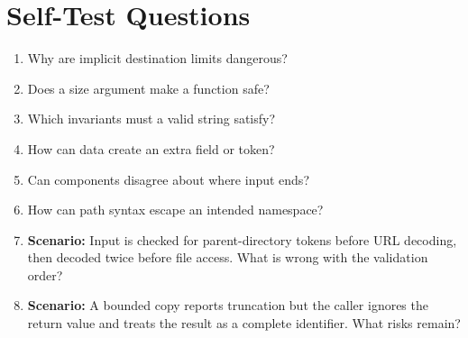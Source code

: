 \documentclass[11pt,letterpaper]{article}
\begin{document}
\section{Self-Test Questions}
\begin{enumerate}
\item Why are implicit destination limits dangerous?
\item Does a size argument make a function safe?
\item Which invariants must a valid string satisfy?
\item How can data create an extra field or token?
\item Can components disagree about where input ends?
\item How can path syntax escape an intended namespace?
\item \textbf{Scenario:} Input is checked for parent-directory tokens before URL decoding, then decoded twice before file access. What is wrong with the validation order?
\item \textbf{Scenario:} A bounded copy reports truncation but the caller ignores the return value and treats the result as a complete identifier. What risks remain?
\end{enumerate}
\clearpage
\end{document}
